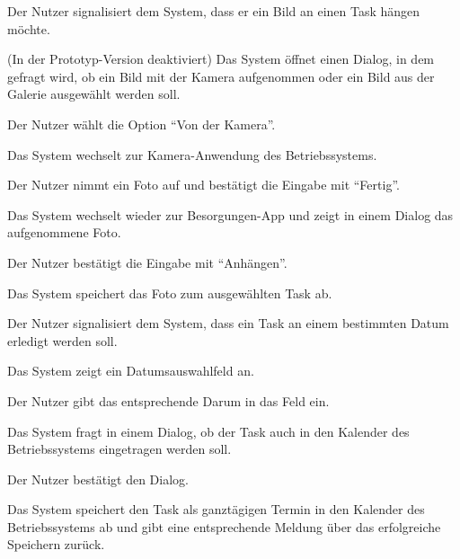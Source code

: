 	\label{addImage}
	\begin{description}
		\begin{verlauf}
		
			\item Der Nutzer signalisiert dem System, dass er ein Bild an einen Task hängen möchte.
			\item (In der Prototyp-Version deaktiviert) Das System öffnet einen Dialog, in dem gefragt wird, ob ein Bild mit der Kamera aufgenommen oder ein Bild aus der Galerie ausgewählt werden soll.
			\item Der Nutzer wählt die Option \enquote{Von der Kamera}.
			\item Das System wechselt zur Kamera-Anwendung des Betriebssystems.
			\item Der Nutzer nimmt ein Foto auf und bestätigt die Eingabe mit \enquote{Fertig}.
			\item Das System wechselt wieder zur Besorgungen-App und zeigt in einem Dialog das aufgenommene Foto.
			\item Der Nutzer bestätigt die Eingabe mit \enquote{Anhängen}.
			\item Das System speichert das Foto zum ausgewählten Task ab.
				
		\end{verlauf}
		
	\end{description}

	\label{terminateTask}
	\begin{description}
		\actors{Initiiert vom Listenmitglied}
		\begin{verlauf}
		
			\item Der Nutzer signalisiert dem System, dass ein Task an einem bestimmten Datum erledigt werden soll.
			\item Das System zeigt ein Datumsauswahlfeld an.
			\item Der Nutzer gibt das entsprechende Darum in das Feld ein.
			\item Das System fragt in einem Dialog, ob der Task auch in den Kalender des Betriebssystems eingetragen werden soll.
			\item Der Nutzer bestätigt den Dialog.
			\item Das System speichert den Task als ganztägigen Termin in den Kalender des Betriebssystems ab und gibt eine entsprechende Meldung über das erfolgreiche Speichern zurück.
				
		\end{verlauf}
		
	\end{description}

